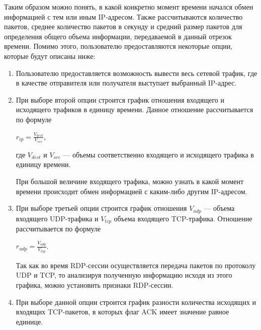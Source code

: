 \documentclass[bachelor, och, coursework]{SCWorks}
\begin{document}
  Таким образом можно понять, в какой конкретно момент времени начался обмен информацией с тем или иным 
  IP-адресом. Также рассчитываются количество пакетов, среднее количество пакетов в секунду и средний размер пакетов для определения общего объема 
  информации, передаваемой в данный отрезок времени. Помимо этого, пользователю предоставляются некоторые опции, которые будут описаны ниже:
  
  \begin{enumerate}
    \item Пользователю предоставляется возможность вывести весь сетевой трафик, где в качестве отправителя или получателя выступает выбранный IP-адрес.
    \item При выборе второй опции строится график отношения входящего и исходящего трафиков в единицу времени. Данное отношение рассчитывается по формуле
    
    \begin{center}
      $r_{ip} = \frac{V_{dest}}{V_{src}}$,
    \end{center}

    где $V_{dest}$ и $V_{src}$ --- объемы соответственно входящего и исходящего трафика в единицу времени. 
     
    При большой величине входящего трафика, можно узнать в какой момент времени происходит обмен информацией с каким-либо другим IP-адресом.
    \item При выборе третьей опции строится график отношения $V_{udp}$ --- объема входящего UDP-трафика и $V_{tcp}$ объема входящего TCP-трафика.
    Отношение рассчитывается по формуле

    \begin{center}
      $r_{udp} = \frac{V_{udp}}{V_{tcp}}$.
    \end{center}

    Так как во время RDP-сессии осуществляется передача пакетов по протоколу UDP и TCP, то анализируя полученную информацию исходя из этого графика,
    можно установить признаки RDP-сессии.

    \item При выборе данной опции строится график разности количества исходящих и входящих TCP-пакетов, в которых флаг ACK имеет значение
    равное единице.


\end{enumerate}
\end{document}
